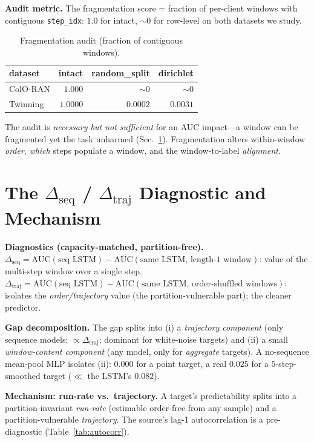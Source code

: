 \documentclass[conference]{IEEEtran}
\newcommand{\dseq}{\Delta_{\mathrm{seq}}}
\newcommand{\dtraj}{\Delta_{\mathrm{traj}}}
\newcommand{\code}[1]{\texttt{#1}}
\begin{document}
\textbf{Audit metric.} The fragmentation score = fraction of per-client windows with contiguous
\code{step\_idx}: $1.0$ for intact, ${\sim}0$ for row-level on both datasets we study.

\begin{table}[t]\centering\caption{Fragmentation audit (fraction of contiguous windows).}\label{tab:audit}
\begin{tabular}{lrrr}\toprule
dataset & intact & random\_split & dirichlet \\\midrule
ColO-RAN & $1.000$ & ${\sim}0$ & ${\sim}0$ \\
Twinning & $1.0000$ & $0.0002$ & $0.0031$ \\\bottomrule
\end{tabular}\end{table}

The audit is \emph{necessary but not sufficient} for an AUC impact---a window can be fragmented yet the
task unharmed (Sec.~\ref{sec:diag}). Fragmentation alters within-window \emph{order}, \emph{which} steps
populate a window, and the window-to-label \emph{alignment}.

\section{The $\dseq$ / $\dtraj$ Diagnostic and Mechanism}\label{sec:diag}
\textbf{Diagnostics (capacity-matched, partition-free).} $\dseq = \mathrm{AUC}(\text{seq LSTM}) -
\mathrm{AUC}(\text{same LSTM, length-1 window})$: value of the multi-step window over a single step.
$\dtraj = \mathrm{AUC}(\text{seq LSTM}) - \mathrm{AUC}(\text{same LSTM, order-shuffled windows})$:
isolates the \emph{order/trajectory} value (the partition-vulnerable part); the cleaner predictor.

\textbf{Gap decomposition.} The gap splits into (i) a \emph{trajectory component} (only sequence models;
$\propto\dtraj$; dominant for white-noise targets) and (ii) a small \emph{window-content component} (any
model, only for \emph{aggregate} targets). A no-sequence mean-pool MLP isolates (ii): $0.000$ for a point
target, a real $0.025$ for a $5$-step-smoothed target ($\ll$ the LSTM's $0.082$).

\textbf{Mechanism: run-rate vs.\ trajectory.} A target's predictability splits into a partition-invariant
\emph{run-rate} (estimable order-free from any sample) and a partition-vulnerable \emph{trajectory}. The
source's lag-1 autocorrelation is a pre-diagnostic (Table~\ref{tab:autocorr}).
\end{document}
